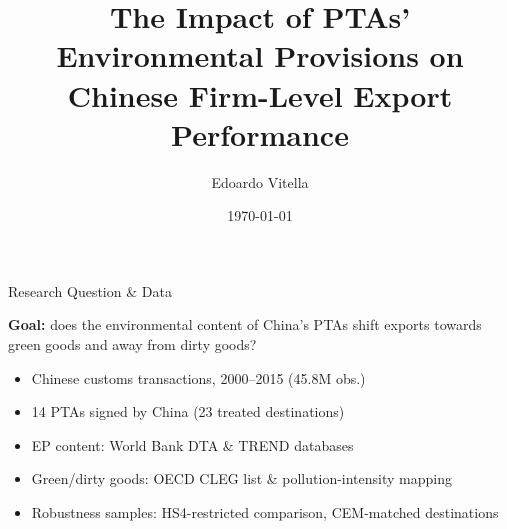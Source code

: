 \documentclass{beamer}
\title{The Impact of PTAs' Environmental Provisions on\\Chinese Firm-Level Export Performance}
\author{Edoardo Vitella}
\institute{University of Trento \& Free University of Bozen-Bolzano}
\date{\today}
\begin{document}
\begin{frame}
  \titlepage
\end{frame}

\begin{frame}{Research Question \& Data}

  \textbf{Goal:} does the environmental content of China's PTAs shift
  exports towards green goods and away from dirty goods?

  \vspace{1.2em}
  \begin{itemize}\setlength\itemsep{10pt}
    \item Chinese customs transactions, 2000--2015 \hfill \small(45.8M obs.)
    \item 14 PTAs signed by China \hfill \small(23 treated destinations)
    \item EP content: World Bank DTA \& TREND databases
    \item Green/dirty goods: OECD CLEG list \& pollution-intensity mapping
    \item Robustness samples: HS4-restricted comparison, CEM-matched destinations
  \end{itemize}

\end{frame}
\end{document}
